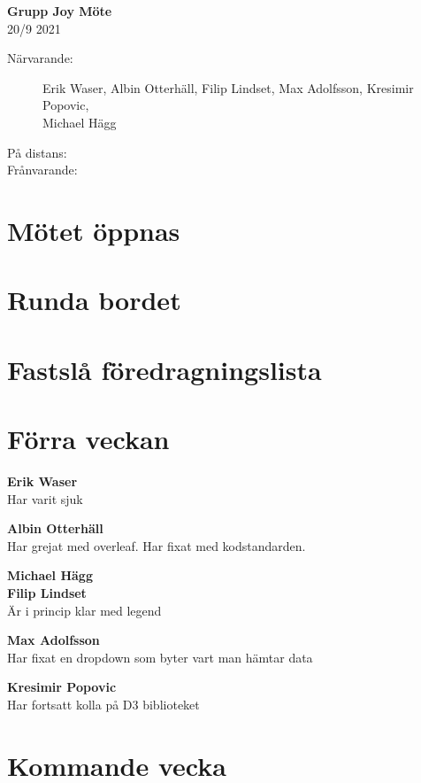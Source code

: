 \documentclass[9pt]{article}
\newcommand{\Waser}{Erik Waser\xspace}
\newcommand{\Slaget}{Albin Otterhäll\xspace}
\newcommand{\Max}{Max Adolfsson\xspace}
\newcommand{\Kim}{Michael Hägg\xspace}
\newcommand{\Algen}{Filip Lindset\xspace}
\newcommand{\Kres}{Kresimir Popovic\xspace}
\newcommand{\datum}{20/9 2021} %
\begin{document}
\begin{center}
    \Large{\textbf{Grupp Joy Möte}}\\
    \normalsize
    \datum \\ %
\end{center}

\begin{description} %
  \item [Närvarande:] \Waser, \Slaget, \Algen, \Max, \Kres, \\ \Kim
  \item [På distans:]
  \item [Frånvarande:]

\end{description}

\section{Mötet öppnas}

\section{Runda bordet}

\section{Fastslå föredragningslista}

\section{Förra veckan}
\textbf{\Waser}\\ Har varit sjuk

\textbf{\Slaget}\\ Har grejat med overleaf. Har fixat med kodstandarden. 

\textbf{\Kim}\\

\textbf{\Algen}\\ Är i princip klar med legend

\textbf{\Max}\\ Har fixat en dropdown som byter vart man hämtar data

\textbf{\Kres}\\ Har fortsatt kolla på D3 biblioteket 


\section{Kommande vecka}
\end{document}
